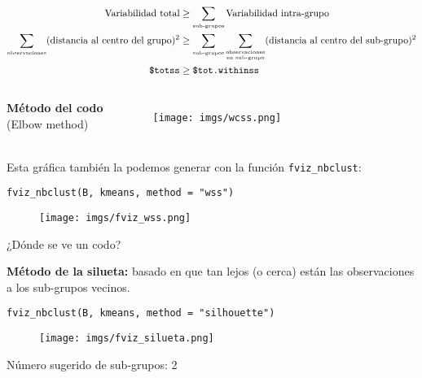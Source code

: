 \documentclass[10pt, aspectratio=169]{beamer}
\begin{document}
{
\begin{frame}[fragile]{}
\begin{align*}
 \mbox{Variabilidad total} &\geq \sum_{\mbox{\tiny sub-grupos}} \mbox{Variabilidad intra-grupo}\\
 \sum_{\mbox{\tiny observaciones}} (\mbox{distancia al centro del grupo})^2 &\geq \sum_{\mbox{\tiny sub-grupos}} \sum_{\substack{\mbox{\tiny observaciones}\\\mbox{\tiny en sub-grupo}}} (\mbox{distancia al centro del sub-grupo})^2\\
 \mbox{\texttt{\$totss}} &\geq \mbox{\texttt{\$tot.withinss}}
\end{align*}
\pause
\vspace{-0.4cm}
\begin{columns}
 \begin{center}
  \textcolor{UltraViolet}{\textbf{\large Método del codo}}\\
  (Elbow method)\\
  \vspace{0.3cm}
 \end{center}
 \begin{figure}
 \texttt{[image: imgs/wcss.png]}
\end{figure}
\end{columns}
\end{frame}
}

{
\begin{frame}[fragile]{}
\vspace{0.3cm}
Esta gráfica también la podemos generar con la función \texttt{fviz\_nbclust}:\\
\begin{verbatim}
fviz_nbclust(B, kmeans, method = "wss")
\end{verbatim}
\pause
\begin{figure}
 \texttt{[image: imgs/fviz\_wss.png]}
\end{figure}
\pause
\vspace{-0.2cm}
¿Dónde se ve un codo?
\end{frame}
}

{
\begin{frame}[fragile]{}
\vspace{0.3cm}
\textcolor{UltraViolet}{\textbf{\large Método de la silueta:}} basado en que tan lejos (o cerca) están las observaciones a los sub-grupos vecinos.
\begin{verbatim}
fviz_nbclust(B, kmeans, method = "silhouette")
\end{verbatim}
\pause
\begin{figure}
 \texttt{[image: imgs/fviz\_silueta.png]}
\end{figure}
\pause
\vspace{-0.2cm}
Número sugerido de sub-grupos: 2
\end{frame}
}
\end{document}
